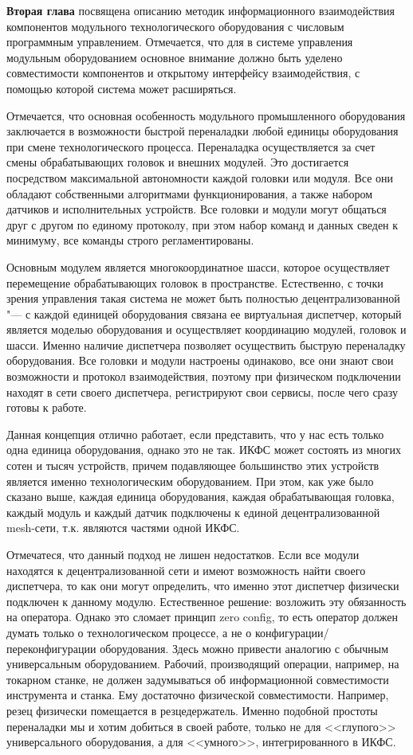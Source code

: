 \textbf{Вторая глава} посвящена описанию методик информационного взаимодействия компонентов модульного технологического оборудования с числовым программным управлением. Отмечается, что для в системе управления модульным оборудованием основное внимание должно быть уделено совместимости компонентов и открытому интерфейсу взаимодействия, с помощью которой система может расширяться. 

Отмечается, что основная особенность модульного промышленного оборудования заключается в возможности быстрой переналадки любой единицы оборудования при смене технологического процесса. Переналадка осуществляется за счет смены обрабатывающих головок и внешних модулей.  Это достигается посредством максимальной автономности каждой головки или модуля. Все они обладают собственными алгоритмами функционирования, а также набором датчиков и исполнительных устройств. Все головки и модули могут общаться друг с другом по единому протоколу, при этом набор команд и данных сведен к минимуму, все команды строго регламентированы.

Основным модулем является многокоординатное шасси, которое осуществляет перемещение обрабатывающих головок в пространстве. Естественно, с точки зрения управления такая система не может быть полностью децентрализованной "--- с каждой единицей оборудования связана ее виртуальная диспетчер, который является моделью оборудования и осуществляет координацию модулей, головок и шасси. Именно наличие диспетчера позволяет осуществить быструю переналадку оборудования. Все головки и модули настроены одинаково, все они знают свои возможности и протокол взаимодействия, поэтому при физическом подключении находят в сети своего диспетчера, регистрируют свои сервисы, после чего сразу готовы к работе.

Данная концепция отлично работает, если представить, что у нас есть только одна единица оборудования, однако это не так. ИКФС может состоять из многих сотен и тысяч устройств, причем подавляющее большинство этих устройств является именно технологическим оборудованием. При этом, как уже было сказано выше, каждая единица оборудования, каждая обрабатывающая головка, каждый модуль и каждый датчик подключены к единой децентрализованной mesh-сети, т.\:к. являются частями одной ИКФС.

Отмечатеся, что данный подход не лишен недостатков. Если все модули находятся к децентрализованной сети и имеют возможность найти своего диспетчера, то как они могут определить, что именно этот диспетчер физически подключен к данному модулю. Естественное решение: возложить эту обязанность на оператора. Однако это сломает принцип zero config, то есть оператор должен думать только о технологическом процессе, а не о конфигурации/переконфигурации оборудования. Здесь можно привести аналогию с обычным универсальным оборудованием. Рабочий, производящий операции, например, на токарном станке, не должен задумываться об информационной совместимости инструмента и станка. Ему достаточно физической совместимости. Например, резец физически помещается в резцедержатель. Именно подобной простоты переналадки мы и хотим добиться в своей работе, только не для <<глупого>> универсального оборудования, а для <<умного>>, интегрированного в ИКФС.

